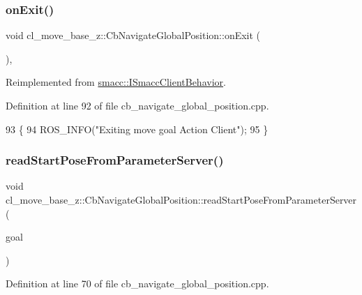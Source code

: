 \subsubsection{\texorpdfstring{on\+Exit()}{onExit()}}
{\footnotesize\ttfamily void cl\+\_\+move\+\_\+base\+\_\+z\+::\+Cb\+Navigate\+Global\+Position\+::on\+Exit (\begin{DoxyParamCaption}{ }\end{DoxyParamCaption})\hspace{0.3cm}{\ttfamily [override]}, {\ttfamily [virtual]}}



Reimplemented from \hyperlink{classsmacc_1_1ISmaccClientBehavior_a36bf771905e3bf750909a15e4215a9b3}{smacc\+::\+I\+Smacc\+Client\+Behavior}.



Definition at line 92 of file cb\+\_\+navigate\+\_\+global\+\_\+position.\+cpp.


\begin{DoxyCode}
93     \{
94         ROS\_INFO(\textcolor{stringliteral}{"Exiting move goal Action Client"});
95     \}
\end{DoxyCode}
\mbox{\label{classcl__move__base__z_1_1CbNavigateGlobalPosition_a868b25f238e3781c9a2e44b4e1502fcc}} 
\subsubsection{\texorpdfstring{read\+Start\+Pose\+From\+Parameter\+Server()}{readStartPoseFromParameterServer()}}
{\footnotesize\ttfamily void cl\+\_\+move\+\_\+base\+\_\+z\+::\+Cb\+Navigate\+Global\+Position\+::read\+Start\+Pose\+From\+Parameter\+Server (\begin{DoxyParamCaption}\item[{Cl\+Move\+Base\+Z\+::\+Goal \&}]{goal }\end{DoxyParamCaption})}



Definition at line 70 of file cb\+\_\+navigate\+\_\+global\+\_\+position.\+cpp.



